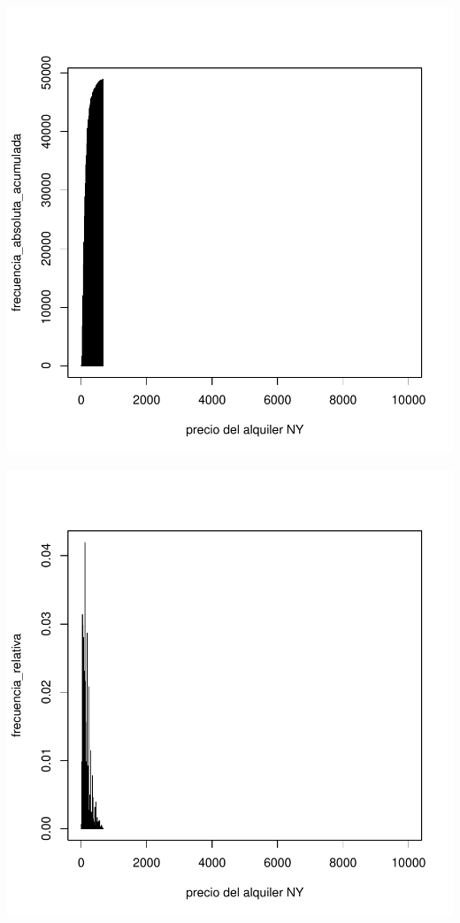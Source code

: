 \documentclass [a4paper] {article}
\begin{document}
\begin{center}
\includegraphics{entrega-frecuencia_absoluta_acumulada_BNB_plot}
\end{center}
\begin{Schunk}
\end{Schunk}
\begin{center}
\includegraphics{entrega-frecuencia_relativa_BNB_plot}
\end{center}
\end{document}
